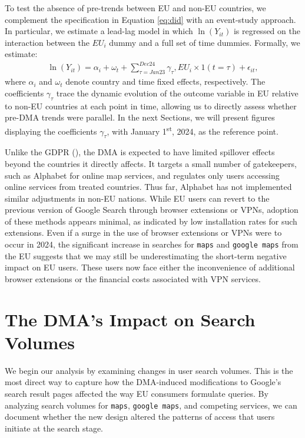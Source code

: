 \documentclass[11pt]{article}
\begin{document}
	To test the absence of pre-trends between EU and non-EU countries, we complement the specification in Equation \ref{eq:did} with an event-study approach. In particular, we estimate a lead-lag model in which $\ln \left( Y_{it} \right)$ is regressed on the interaction between the $\textit{EU}_i$ dummy and a full set of time dummies. Formally, we estimate:
	\begin{align}\label{eq:Event_Study}
		\ln \left( Y_{it} \right) = \alpha_i+ \omega_t + \sum_{\tau=Jan23}^{Dec24} \gamma_\tau , \textit{EU}_i \times 1(t=\tau) + \epsilon_{it},
	\end{align}
	where $\alpha_i$ and $\omega_t$ denote country and time fixed effects, respectively. The coefficients $\gamma_\tau$ trace the dynamic evolution of the outcome variable in EU relative to non-EU countries at each point in time, allowing us to directly assess whether pre-DMA trends were parallel. In the next Sections, we will present figures displaying the coefficients $\gamma_\tau$, with January 1\textsuperscript{st}, 2024, as the reference point.
	
	Unlike the GDPR (\citealp{johnson2022economic}), the DMA is expected to have limited spillover effects beyond the countries it directly affects. It targets a small number of gatekeepers, such as Alphabet for online map services, and regulates only users accessing online services from treated countries. Thus far, Alphabet has not implemented similar adjustments in non-EU nations.
	While EU users can revert to the previous version of Google Search through browser extensions or VPNs, adoption of these methods appears minimal, as indicated by low installation rates for such extensions. Even if a surge in the use of browser extensions or VPNs were to occur in 2024, the significant increase in searches for \texttt{maps} and \texttt{google maps} from the EU suggests that we may still be underestimating the short-term negative impact on EU users. These users now face either the inconvenience of additional browser extensions or the financial costs associated with VPN services.
	
	\section{The DMA's Impact on Search Volumes}\label{sec:results}
	
	We begin our analysis by examining changes in user search volumes. This is the most direct way to capture how the DMA-induced modifications to Google’s search result pages affected the way EU consumers formulate queries. By analyzing search volumes for \texttt{maps}, \texttt{google maps}, and competing services, we can document whether the new design altered the patterns of access that users initiate at the search stage.
	
\end{document}

